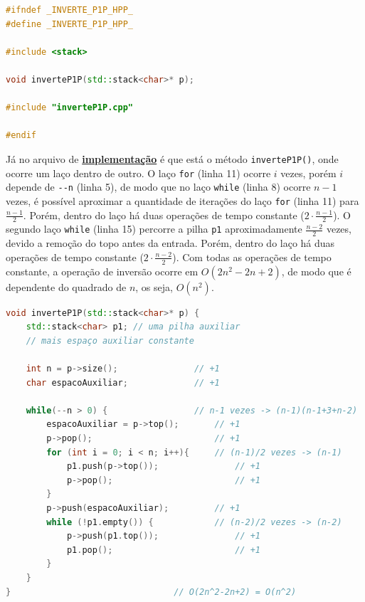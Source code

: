 \documentclass[
  brazilian,
  paper=a4,
  oneside  ,captions=tableheading
]{scrbook}
\newcommand{\passthrough}[1]{#1}
\begin{document}
\begin{lstlisting}[language={C++}]
#ifndef _INVERTE_P1P_HPP_
#define _INVERTE_P1P_HPP_

#include <stack>

void inverteP1P(std::stack<char>* p);

#include "inverteP1P.cpp"

#endif
\end{lstlisting}

Já no arquivo de
\href{https://github.com/ecostadelle/lista_pilhas_filas/blob/main/include/inverteP1P.cpp}{\textbf{implementação}}
é que está o método \passthrough{\lstinline!inverteP1P()!}, onde ocorre
um laço dentro de outro. O laço \passthrough{\lstinline!for!} (linha 11)
ocorre \(i\) vezes, porém \(i\) depende de \passthrough{\lstinline!--n!}
(linha 5), de modo que no laço \passthrough{\lstinline!while!} (linha 8)
ocorre \(n-1\) vezes, é possível aproximar a quantidade de iterações do
laço \passthrough{\lstinline!for!} (linha 11) para \(\frac{n-1}{2}\).
Porém, dentro do laço há duas operações de tempo constante
(\(2 \cdot \frac{n-1}{2}\)). O segundo laço
\passthrough{\lstinline!while!} (linha 15) percorre a pilha
\passthrough{\lstinline!p1!} aproximadamente \(\frac{n-2}{2}\) vezes,
devido a remoção do topo antes da entrada. Porém, dentro do laço há duas
operações de tempo constante (\(2 \cdot \frac{n-2}{2}\)). Com todas as
operações de tempo constante, a operação de inversão ocorre em
\(O(2n^2-2n+2)\), de modo que é dependente do quadrado de \(n\), os
seja, \(O(n^2)\).

\begin{lstlisting}[language={C++}]
void inverteP1P(std::stack<char>* p) { 
    std::stack<char> p1; // uma pilha auxiliar 
    // mais espaço auxiliar constante 

    int n = p->size();               // +1 
    char espacoAuxiliar;             // +1

    while(--n > 0) {                 // n-1 vezes -> (n-1)(n-1+3+n-2) 
        espacoAuxiliar = p->top();       // +1
        p->pop();                        // +1
        for (int i = 0; i < n; i++){     // (n-1)/2 vezes -> (n-1)
            p1.push(p->top());               // +1
            p->pop();                        // +1
        }
        p->push(espacoAuxiliar);         // +1
        while (!p1.empty()) {            // (n-2)/2 vezes -> (n-2)
            p->push(p1.top());               // +1
            p1.pop();                        // +1
        }
    }
}                                // O(2n^2-2n+2) = O(n^2)
\end{lstlisting}
\end{document}

